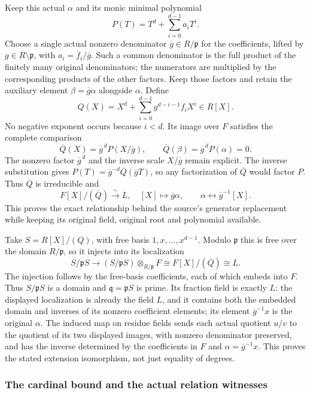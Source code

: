 Keep this actual \(\alpha\) and its monic minimal polynomial \[
 P(T)=T^d+\sum_{i=0}^{d-1}a_iT^i.
\] Choose a single actual nonzero denominator \(\overline g\in R/\mathfrak p\) for the coefficients, lifted by \(g\in R\setminus\mathfrak p\), with \(a_i=\overline f_i/\overline g\). Such a common denominator is the full product of the finitely many original denominators; the numerators are multiplied by the corresponding products of the other factors. Keep those factors and retain the auxiliary element \(\beta=\overline g\alpha\) alongside \(\alpha\). Define \[
 Q(X)=X^d+\sum_{i=0}^{d-1}g^{d-i-1}f_iX^i\in R[X].
\] No negative exponent occurs because \(i<d\). Its image over \(F\) satisfies the complete comparison \[
 \overline Q(X)=\overline g^{\,d}P(X/\overline g),
 \qquad
 \overline Q(\beta)=\overline g^{\,d}P(\alpha)=0.
\] The nonzero factor \(\overline g^{\,d}\) and the inverse scale \(X/\overline g\) remain explicit. The inverse substitution gives \(P(T)=\overline g^{-d}\overline Q(\overline gT)\), so any factorization of \(\overline Q\) would factor \(P\). Thus \(\overline Q\) is irreducible and \[
 F[X]/(\overline Q)\xrightarrow{\sim}L,\quad [X]\longmapsto\overline g\alpha,
 \qquad \alpha\longleftrightarrow\overline g^{-1}[X].
\] This proves the exact relationship behind the source's generator replacement while keeping its original field, original root and polynomial available.

Take \(S=R[X]/(Q)\), with free basis \(1,x,\ldots,x^{d-1}\). Modulo \(\mathfrak p\) this is free over the domain \(R/\mathfrak p\), so it injects into its localization \[
 S/\mathfrak pS\longrightarrow
 (S/\mathfrak pS)\otimes_{R/\mathfrak p}F
       \cong F[X]/(\overline Q)\cong L.
\] The injection follows by the free-basis coefficients, each of which embeds into \(F\). Thus \(S/\mathfrak pS\) is a domain and \(\mathfrak q=\mathfrak pS\) is prime. Its fraction field is exactly \(L\): the displayed localization is already the field \(L\), and it contains both the embedded domain and inverses of its nonzero coefficient elements; its element \(\overline g^{-1}x\) is the original \(\alpha\). The induced map on residue fields sends each actual quotient \(u/v\) to the quotient of its two displayed images, with nonzero denominator preserved, and has the inverse determined by the coefficients in \(F\) and \(\alpha=\overline g^{-1}x\). This proves the stated extension isomorphism, not just equality of degrees.

\subsubsection{The cardinal bound and the actual relation witnesses}\label{algebra-proof-064-the-cardinal-bound-and-the-actual-relation-witnesses}

